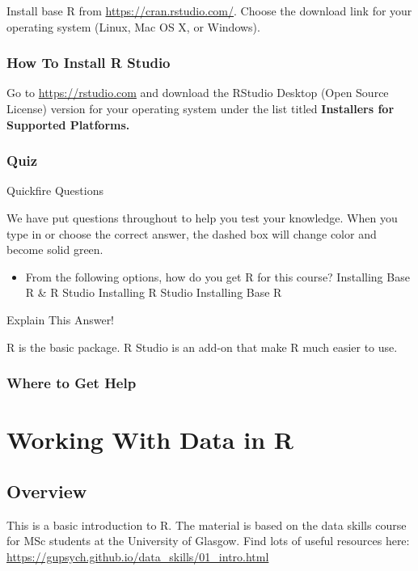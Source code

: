 \documentclass[]{book}
\providecommand{\tightlist}{%
  \setlength{\itemsep}{0pt}\setlength{\parskip}{0pt}}
\begin{document}
Install base R from \url{https://cran.rstudio.com/}. Choose the download
link for your operating system (Linux, Mac OS X, or Windows).

\subsection{How To Install R Studio}\label{how-to-install-r-studio}

Go to \url{https://rstudio.com} and download the RStudio Desktop (Open
Source License) version for your operating system under the list titled
\textbf{Installers for Supported Platforms.}

\subsection{Quiz}\label{quiz}

{Quickfire Questions}

We have put questions throughout to help you test your knowledge. When
you type in or choose the correct answer, the dashed box will change
color and become solid green.

\begin{itemize}
\tightlist
\item
  From the following options, how do you get R for this course?
  Installing Base R \& R Studio Installing R Studio Installing Base R
\end{itemize}

Explain This Answer!

R is the basic package. R Studio is an add-on that make R much easier to
use.

\subsection{Where to Get Help}\label{where-to-get-help}

\chapter{Working With Data in R}\label{working-with-data-in-r}

\section{Overview}\label{overview-2}

This is a basic introduction to R. The material is based on the data
skills course for MSc students at the University of Glasgow. Find lots
of useful resources here:
\url{https://gupsych.github.io/data_skills/01_intro.html}
\end{document}
